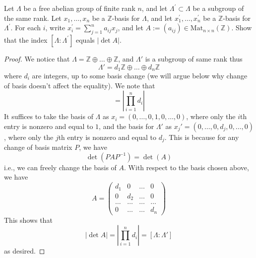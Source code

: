 \documentclass[openany]{book}
\newcommand{\Z}{\mathbb{Z}}
\begin{document}
\begin{prob}
    Let \(\Lambda\) be a free abelian group of finite rank \(n\), and let \(\Lambda^{\prime}\subset\Lambda\) be a subgroup of the same rank. Let \(x_{1},\ldots,x_{n}\) be a \(\mathbb{Z}\)-basis for \(\Lambda\), and let \(x^{\prime}_{1},\ldots,x^{\prime}_{n}\) be a \(\mathbb{Z}\)-basis for \(\Lambda^{\prime}\). For each \(i\), write \(x^{\prime}_{i}=\sum_{j=1}^{n}a_{ij}x_{j}\), and let \(A:=(a_{ij})\in \text{Mat}_{n\times n}(\mathbb{Z})\). Show that the index \([\Lambda:\Lambda^{\prime}]\) equals \(|\det A|\).
\end{prob}
\begin{proof}
    We notice that $\Lambda=\Z\oplus\dots\oplus\Z$, and $\Lambda'$ is a subgroup of same rank thus 
    \begin{equation*}
        \Lambda'=d_1\Z\oplus\dots\oplus d_n\Z
    \end{equation*}
    where $d_i$ are integers, up to some basis change (we will argue below why change of basis doesn't affect the equality). We note that 
    \begin{equation*}
        [\Lambda:\Lambda']=\left|\prod_{i=1}^nd_i\right|
    \end{equation*}
    It suffices to take the basis of $\Lambda$ as $x_i=(0,\dots,0,1,0,\dots,0)$, where only the $i$th entry is nonzero and equal to $1$, and the basis for $\Lambda'$ as $x_j'=(0,\dots, 0,d_j,0,\dots, 0)$, where only the $j$th entry is nonzero and equal to $d_j$. This is because for any change of basis matrix $P$, we have 
    \begin{equation*}
        \det(PAP^{-1})=\det(A)
    \end{equation*} 
    i.e., we can freely change the basis of $A$. With respect to the basis chosen above, we have 
    \begin{equation*}
        A=\begin{pmatrix}
            d_1&0&\dots&0\\
            0&d_2&\dots&0\\
            \dots&\dots&\dots&\dots\\
            0&\dots&\dots&d_n
        \end{pmatrix}
    \end{equation*}
    This shows that 
    \begin{equation*}
        \left|\det A\right|=\left|\prod_{i=1}^nd_i\right|=[\Lambda:\Lambda']
    \end{equation*}
    as desired.
\end{proof}
\end{document}
